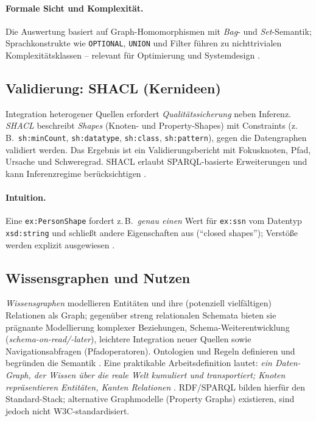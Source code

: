 \paragraph{Formale Sicht und Komplexität.}
Die Auswertung basiert auf Graph-Homomorphismen mit \emph{Bag}- und \emph{Set}-Semantik; Sprachkonstrukte wie \texttt{OPTIONAL}, \texttt{UNION} und Filter führen zu nichttrivialen Komplexitätsklassen -- relevant für Optimierung und Systemdesign \cite{perezGutierrezSparql}.

\subsection{Validierung: SHACL (Kernideen)}

Integration heterogener Quellen erfordert \emph{Qualitätssicherung} neben Inferenz. \emph{SHACL} beschreibt \emph{Shapes} (Knoten- und Property-Shapes) mit Constraints (z.\,B.\ \texttt{sh:minCount}, \texttt{sh:datatype}, \texttt{sh:class}, \texttt{sh:pattern}), gegen die Datengraphen validiert werden. Das Ergebnis ist ein Validierungsbericht mit Fokusknoten, Pfad, Ursache und Schweregrad. SHACL erlaubt SPARQL-basierte Erweiterungen und kann Inferenzregime berücksichtigen \cite{SHACL12}.

\paragraph{Intuition.} Eine \texttt{ex:PersonShape} fordert z.\,B.\ \emph{genau einen} Wert für \texttt{ex:ssn} vom Datentyp \texttt{xsd:string} und schließt andere Eigenschaften aus (``closed shapes''); Verstöße werden explizit ausgewiesen \cite{SHACL12}.

\subsection{Wissensgraphen und Nutzen}

\emph{Wissensgraphen} modellieren Entitäten und ihre (potenziell vielfältigen) Relationen als Graph; gegenüber streng relationalen Schemata bieten sie prägnante Modellierung komplexer Beziehungen, Schema-Weiterentwicklung (\emph{schema-on-read/-later}), leichtere Integration neuer Quellen sowie Navigationsabfragen (Pfadoperatoren). Ontologien und Regeln definieren und begründen die Semantik \cite{hogan2021}. Eine praktikable Arbeitsdefinition lautet: \emph{ein Daten-Graph, der Wissen über die reale Welt kumuliert und transportiert; Knoten repräsentieren Entitäten, Kanten Relationen} \cite{hogan2021}. RDF/SPARQL bilden hierfür den Standard-Stack; alternative Graphmodelle (Property Graphs) existieren, sind jedoch nicht W3C-standardisiert.

